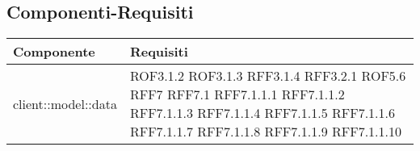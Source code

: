 \subsection{Componenti-Requisiti} %
\label{sub:componenti_requisiti}
\begin{center}
\def\arraystretch{1.5}
\bgroup
\begin{longtable}{| p{9cm} | p{4cm} |}
\hline
\textbf{Componente} & \textbf{Requisiti} \\
\hline
client::model::data  &  ROF3.1.2 \newline ROF3.1.3 \newline RFF3.1.4 \newline RFF3.2.1 \newline ROF5.6 \newline RFF7 \newline RFF7.1 \newline RFF7.1.1.1 \newline RFF7.1.1.2 \newline RFF7.1.1.3 \newline RFF7.1.1.4 \newline RFF7.1.1.5 \newline RFF7.1.1.6 \newline RFF7.1.1.7 \newline RFF7.1.1.8 \newline RFF7.1.1.9 \newline RFF7.1.1.10\newline \\
\hline

\end{longtable}
\end{center}
